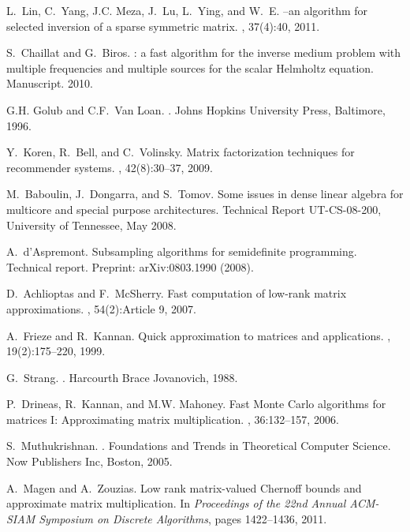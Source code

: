 \documentclass[twoside]{article}
\begin{document}
\begin{small}
\begin{thebibliography}{100}
L.~Lin, C.~Yang, J.C. Meza, J.~Lu, L.~Ying, and W.~E.
--an algorithm for selected inversion of a sparse symmetric
  matrix.
, 37(4):40, 2011.

S.~Chaillat and G.~Biros.
: a fast algorithm for the inverse medium problem with
  multiple frequencies and multiple sources for the scalar {H}elmholtz
  equation.
\newblock Manuscript. 2010.

G.H. Golub and C.F.~Van Loan.
.
\newblock Johns Hopkins University Press, Baltimore, 1996.

Y.~Koren, R.~Bell, and C.~Volinsky.
\newblock Matrix factorization techniques for recommender systems.
, 42(8):30--37, 2009.

M.~Baboulin, J.~Dongarra, and S.~Tomov.
\newblock Some issues in dense linear algebra for multicore and special purpose
  architectures.
\newblock Technical Report UT-CS-08-200, University of Tennessee, May 2008.

A.~d'Aspremont.
\newblock Subsampling algorithms for semidefinite programming.
\newblock Technical report.
\newblock Preprint: arXiv:0803.1990 (2008).

D.~Achlioptas and F.~McSherry.
\newblock Fast computation of low-rank matrix approximations.
, 54(2):Article 9, 2007.

A.~Frieze and R.~Kannan.
\newblock Quick approximation to matrices and applications.
, 19(2):175--220, 1999.

G.~Strang.
.
\newblock Harcourth Brace Jovanovich, 1988.

P.~Drineas, R.~Kannan, and M.W. Mahoney.
\newblock Fast {Monte Carlo} algorithms for matrices {I}: Approximating matrix
  multiplication.
, 36:132--157, 2006.

S.~Muthukrishnan.
.
\newblock Foundations and Trends in Theoretical Computer Science. Now
  Publishers Inc, Boston, 2005.

A.~Magen and A.~Zouzias.
\newblock Low rank matrix-valued {C}hernoff bounds and approximate matrix
  multiplication.
\newblock In {\em Proceedings of the 22nd Annual ACM-SIAM Symposium on Discrete
  Algorithms}, pages 1422--1436, 2011.


\end{thebibliography}
\end{small}
\end{document}
